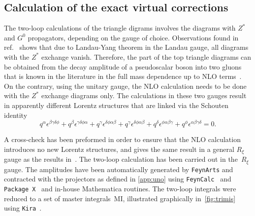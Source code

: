 \subsection{Calculation of the exact virtual corrections}
\par The two-loop calculations of the triangle digrams involves the diagrams with $Z^*$ and $G^0$ propagators, depending on the gauge of choice. Observations found in ref.~\cite{Altenkamp:2012sx} shows that due to Landau-Yang theorem in the Landau gauge, all diagrams with the  $Z^*$ exchange vanish. Therefore, the part of the top triangle diagrams  can be obtained from the decay amplitude of a pseudoscalar boson into two gluons that is known in the literature in the full mass dependence up to NLO terms~\cite{Spira:1995rr,Aglietti:2006tp}. On the contrary, using the unitary gauge, the NLO calculation needs to be done with the $Z^*$ exchange diagrams only.  The calculations in these two gauges result in apparently different Lorentz structures that are linked via the Schouten identity 
\begin{equation}
	q^\alpha \epsilon^{\beta \gamma \delta  \phi} + q^\beta \epsilon^{\gamma \delta  \phi \alpha}+ q^\gamma \epsilon^{ \delta  \phi \alpha \beta} +q^\gamma \epsilon^{ \delta  \phi \alpha \beta} + q^\delta \epsilon^{   \phi \alpha \beta \gamma } +  q^\phi \epsilon^{ \alpha \beta \gamma \delta } =0 .
\end{equation}
\par A cross-check has been preformed in order to ensure that the NLO calculation introduces no new Lorentz structures, and gives the same result in a general $ R_\xi$ gauge as the results in~\cite{Spira:1995rr,Aglietti:2006tp}. The two-loop calculation has been carried out in the~$ R_\xi$ gauge. The amplitudes have been automatically generated by \texttt{FeynArts} \cite{Hahn:2000kx} and
contracted with the projectors as defined in \autoref{app:uno}
using \texttt{FeynCalc }\cite{Mertig:1990an,Shtabovenko:2016sxi} and \texttt{Package X}~\cite{Patel:2016fam} and in-house
Mathematica routines. The two-loop integrals were reduced to a set of master integrals~MI, illustrated graphically in~\autoref{fig:trimis} using \texttt{Kira}~\cite{Maierhofer:2017gsa}.
